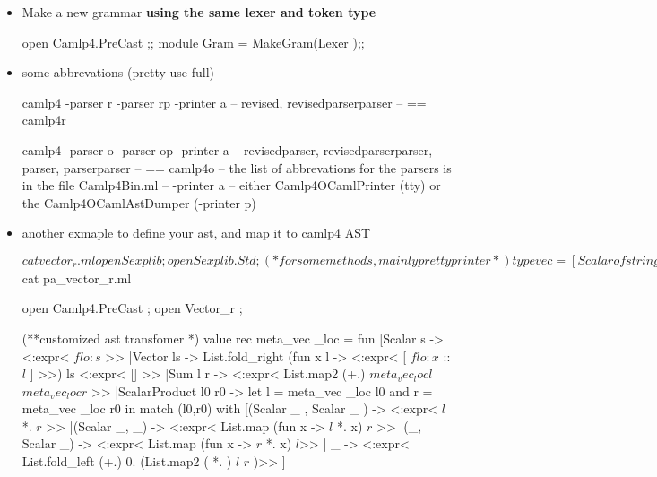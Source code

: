 \begin{itemize}
  error is because we changed the syntax, it can not parse .ocamlinit any more
  we could build .mli by {\bf ocamlbuild xx.inferred.mli} and then copy paste
  \verb|wiki2_r.mli : use_camlp4_full |
  (we are not using extension, just use the library)
\item Make a new grammar {\bf using the same lexer and token type }


\begin{bluecode}
open Camlp4.PreCast ;;
module Gram = MakeGram(Lexer );;
\end{bluecode}


\item some abbrevations (pretty use full)


\begin{bluecode}
camlp4 -parser r -parser rp -printer a
--  revised, revisedparserparser
-- == camlp4r

camlp4 -parser o -parser op -printer a
-- revisedparser, revisedparserparser, parser, parserparser
-- == camlp4o
-- the list of abbrevations for the parsers is in the file Camlp4Bin.ml
-- -printer a
-- either Camlp4OCamlPrinter (tty) or the Camlp4OCamlAstDumper (-printer p)

\end{bluecode}


\item another exmaple to define your ast, and map it to camlp4 AST   


\begin{bluecode}
$cat vector_r.ml
open Sexplib ; 
open Sexplib.Std ;  (* for some methods, mainly pretty printer  *)
type vec = 
  [Scalar of string 
  |Vector of  list string 
  |Sum of vec and vec 
  |ScalarProduct of vec and vec 
  |Antiquot of string ] 
with sexp ;

value (|>) x f = f x ;

value vec_to_string  vec = 
    vec |> sexp_of_vec |> Sexp.to_string ;


$cat pa_vector_r.ml

open Camlp4.PreCast ; 
open Vector_r ;

(**customized ast transfomer *)
value rec meta_vec _loc = fun 
  [Scalar s -> <:expr< $flo:s$ >>
  |Vector ls -> List.fold_right 
    (fun x l -> <:expr< [ $flo:x$ :: $l$ ] >>)
    ls <:expr< [] >> 
  |Sum l r -> <:expr< List.map2 (+.)  $meta_vec _loc l$   $meta_vec _loc r$ >> 
  |ScalarProduct l0 r0 -> 
    let l = meta_vec _loc l0 
    and r = meta_vec _loc r0 
    in match (l0,r0) with 
    [(Scalar _ , Scalar _ ) ->  <:expr< $l$ *. $r$ >>
    |(Scalar _,  _) -> 
      <:expr< List.map (fun x -> $l$ *. x) $r$ >>
    |(_, Scalar _) -> 
      <:expr< List.map (fun x -> $r$ *. x) $l$>>
    | _ -> 
      <:expr< List.fold_left (+.) 0. (List.map2 ( *. ) $l$ $r$ )>>
    ]


\end{bluecode}
\end{itemize}
